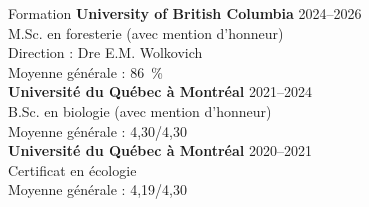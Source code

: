 \documentclass[
	11pt, %
]{resume} %
\begin{document}

\begin{rSection}{Formation}
	\textbf{University of British Columbia} \hfill 2024--2026\\
	M.Sc. en foresterie (avec mention d'honneur) \\
	Direction : Dre E.M. Wolkovich \\
	Moyenne générale : 86~\%
	\smallskip \\
	\textbf{Université du Québec à Montréal} \hfill 2021--2024 \\ 
	B.Sc. en biologie (avec mention d'honneur) \\ 
	Moyenne générale : 4,30/4,30 
	\smallskip \\
	\textbf{Université du Québec à Montréal} \hfill 2020--2021 \\ 
	Certificat en écologie\\ 
	Moyenne générale : 4,19/4,30
\end{rSection}

\end{document}
